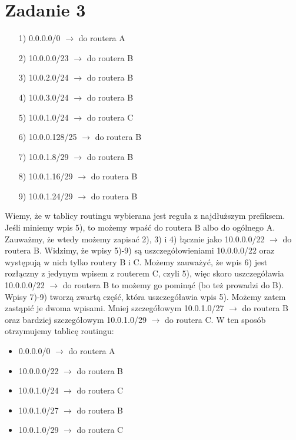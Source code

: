 \documentclass[11pt,wide]{article}
\begin{document}
\section{Zadanie 3}
\begin{itemize}
\item[1)] 0.0.0.0/0 $\rightarrow$ do routera A
\item[2)] 10.0.0.0/23 $\rightarrow$ do routera B
\item[3)] 10.0.2.0/24 $\rightarrow$ do routera B
\item[4)] 10.0.3.0/24 $\rightarrow$ do routera B
\item[5)] 10.0.1.0/24 $\rightarrow$ do routera C
\item[6)] 10.0.0.128/25 $\rightarrow$ do routera B
\item[7)] 10.0.1.8/29 $\rightarrow$ do routera B
\item[8)] 10.0.1.16/29 $\rightarrow$ do routera B
\item[9)] 10.0.1.24/29 $\rightarrow$ do routera B
\end{itemize}
Wiemy, że w tablicy routingu wybierana jest reguła z najdłuższym prefiksem.
Jeśli miniemy wpis 5), to możemy wpaść do routera B albo do ogólnego A. Zauważmy, że wtedy możemy zapisać 2), 3) i 4) łącznie jako 10.0.0.0/22 $\rightarrow$ do routera B. Widzimy, że wpisy 5)-9) są uszczegółowieniami 10.0.0.0/22 oraz występują w nich tylko routery B i C. Możemy zauważyć, że wpis 6) jest rozłączny z jedynym wpisem z routerem C, czyli 5), więc skoro uszczegóławia 10.0.0.0/22 $\rightarrow$ do routera B to możemy go pominąć (bo też prowadzi do B). Wpisy 7)-9) tworzą zwartą część, która uszczegóławia wpis 5). Możemy zatem zastąpić je dwoma wpisami. Mniej szczegółowym 10.0.1.0/27 $\rightarrow$ do routera B oraz bardziej szczegółowym 10.0.1.0/29 $\rightarrow$ do routera C. W ten sposób otrzymujemy tablicę routingu:
\begin{itemize}
\item 0.0.0.0/0 $\rightarrow$ do routera A
\item 10.0.0.0/22 $\rightarrow$ do routera B
\item 10.0.1.0/24 $\rightarrow$ do routera C
\item 10.0.1.0/27 $\rightarrow$ do routera B
\item 10.0.1.0/29 $\rightarrow$ do routera C
\end{itemize}
\end{document}
